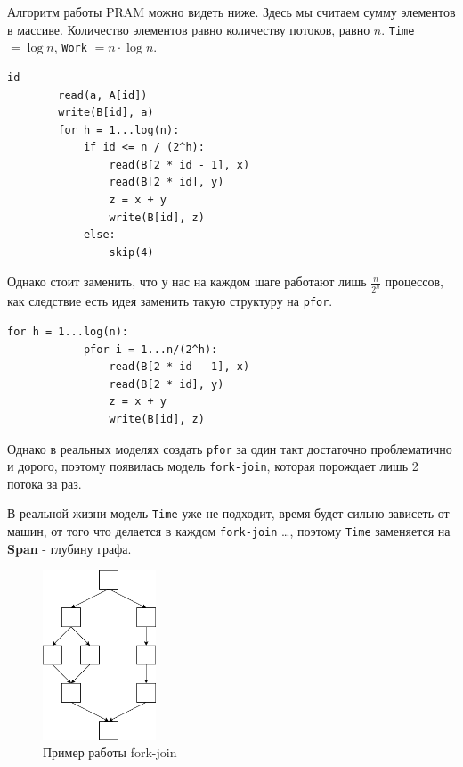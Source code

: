 \documentclass[11pt]{article}
\begin{document}
    Алгоритм работы PRAM можно видеть ниже.
    Здесь мы считаем сумму элементов в массиве.
    Количество элементов равно количеству потоков, равно $n$.
    \texttt{Time} $= \log{n}$, \texttt{Work} $= n \cdot \log{n}$.

    \begin{lstlisting}[label={lst:array_sum},caption={Пример подсчёта суммы элементов в массиве}]
        id
        read(a, A[id])
        write(B[id], a)
        for h = 1...log(n):
            if id <= n / (2^h):
                read(B[2 * id - 1], x)
                read(B[2 * id], y)
                z = x + y
                write(B[id], z)
            else:
                skip(4)
    \end{lstlisting}

    Однако стоит заменить, что у нас на каждом шаге работают лишь $\frac{n}{2^h}$ процессов, как следствие есть идея заменить такую структуру на \texttt{pfor}.

    \begin{lstlisting}[label={lst:pfor}, caption={Работа pfor}]
        for h = 1...log(n):
            pfor i = 1...n/(2^h):
                read(B[2 * id - 1], x)
                read(B[2 * id], y)
                z = x + y
                write(B[id], z)
    \end{lstlisting}

    Однако в реальных моделях создать \texttt{pfor} за один такт достаточно проблематично и дорого,
    поэтому появилась модель \texttt{fork-join}, которая порождает лишь 2 потока за раз.

    В реальной жизни модель \texttt{Time} уже не подходит,
    время будет сильно зависеть от машин, от того что делается в каждом \texttt{fork-join} \ldots,
    поэтому \texttt{Time} заменяется на \textbf{Span} - глубину графа.

    \begin{figure}[h!]
        \centering
        \includegraphics[width=0.3\textwidth]{Pictures/SPAN}
        \caption{Пример работы fork-join}
        \label{fig:fork_join}
    \end{figure}
\end{document}
